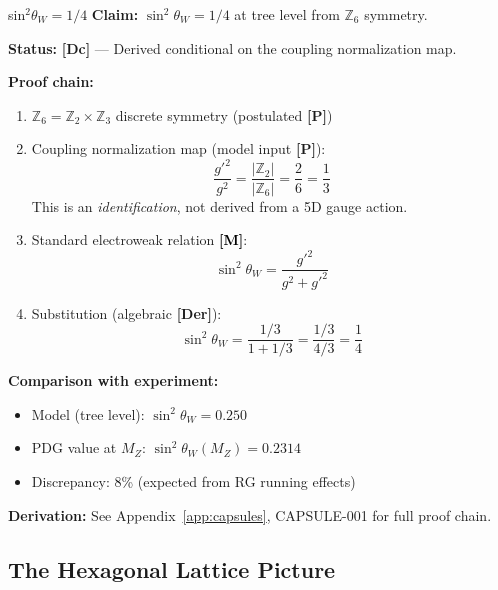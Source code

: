 \documentclass[11pt,a4paper]{article}
\newcommand{\tagP}{\textcolor{red!70!black}{\textbf{[P]}}}
\newcommand{\tagDc}{\textcolor{blue!70!black}{\textbf{[Dc]}}}
\newcommand{\tagDer}{\textcolor{green!50!black}{\textbf{[Der]}}}
\newcommand{\tagM}{\textcolor{black}{\textbf{[M]}}}
\begin{document}
\begin{capsulebox}{sin$^2\theta_W = 1/4$}
\textbf{Claim:} $\sin^2\theta_W = 1/4$ at tree level from $\mathbb{Z}_6$ symmetry.

\textbf{Status:} \tagDc{} --- Derived conditional on the coupling normalization map.

\textbf{Proof chain:}
\begin{enumerate}
    \item $\mathbb{Z}_6 = \mathbb{Z}_2 \times \mathbb{Z}_3$ discrete symmetry (postulated \tagP{})

    \item Coupling normalization map (model input \tagP{}):
    \begin{equation}
        \frac{g'^2}{g^2} = \frac{|\mathbb{Z}_2|}{|\mathbb{Z}_6|} = \frac{2}{6} = \frac{1}{3}
    \end{equation}
    This is an \emph{identification}, not derived from a 5D gauge action.

    \item Standard electroweak relation \tagM{}:
    \begin{equation}
        \sin^2\theta_W = \frac{g'^2}{g^2 + g'^2}
    \end{equation}

    \item Substitution (algebraic \tagDer{}):
    \begin{equation}
        \sin^2\theta_W = \frac{1/3}{1 + 1/3} = \frac{1/3}{4/3} = \frac{1}{4}
        \label{eq:sin2theta_def}
    \end{equation}
\end{enumerate}

\textbf{Comparison with experiment:}
\begin{itemize}[nosep]
    \item Model (tree level): $\sin^2\theta_W = 0.250$
    \item PDG value at $M_Z$: $\sin^2\theta_W(M_Z) = 0.2314$
    \item Discrepancy: 8\% (expected from RG running effects)
\end{itemize}

\textbf{Derivation:} See Appendix~\ref{app:capsules}, CAPSULE-001 for full proof chain.
\end{capsulebox}

\subsection{The Hexagonal Lattice Picture}
\end{document}
